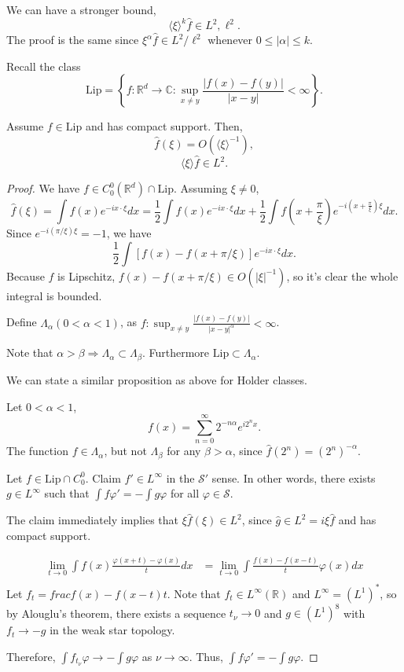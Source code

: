 \documentclass[11pt]{scrartcl}
\newcommand{\R}{\mathbb{R}}
\newcommand{\C}{\mathbb C}
\newcommand{\SRS}{\mathscr {S}}
\let \phi \varphi
\let \hat \widehat
\newcommand{\<}{\langle}
\renewcommand{\>}{\rangle}
\begin{document}
We can have a stronger bound,
$$\<\xi\>^k \hat{f} \in L^2, \ell^2.$$
The proof is the same since $\xi^\alpha \hat{f} \in L^2/ \ell^2$ whenever $0 \le |\alpha| \le k$.   

Recall the class $$\text{Lip} = \left\{f : \R^d \rightarrow \C : \sup_{x \ne y} \frac{|f(x) - f(y)|}{|x-y|} < \infty\right\}.$$
\begin{proposition} Assume $f \in \text{Lip}$ and has compact support.  Then, $$\hat{f}(\xi) = O(\<\xi\>^{-1}),$$
$$\<\xi\> \hat{f} \in L^2.$$
\end{proposition}
\begin{proof}
We have $f \in C_0^0(\R^d) \cap \text{Lip}$.  
Assuming $\xi \ne 0$, 
$$\hat{f}(\xi) = \int f(x) e^{-ix\cdot \xi}dx = \frac{1}{2} \int f(x)e^{-ix \cdot \xi}dx + \frac{1}{2} \int f(x + \frac{\pi}{\xi})e^{-i(x+\frac{\pi}{\xi})\xi}dx.$$
Since $e^{-i(\pi/\xi) \xi} = -1$, we have
$$\frac{1}{2} \int [f(x) - f(x+\pi/\xi)]e^{-ix \cdot \xi} dx.$$
Because $f$ is Lipschitz, $f(x) - f(x+\pi/\xi) \in O(|\xi|^{-1})$, so it's clear the whole integral is bounded.

\begin{definition} Define $\Lambda_{\alpha}(0 < \alpha < 1)$, as 
$f: \sup_{x \ne y} \frac{|f(x) - f(y)|}{|x-y|^{\alpha}} < \infty$. 

Note that $\alpha > \beta \Rightarrow \Lambda_\alpha \subset \Lambda_\beta$.  Furthermore $\text{Lip} \subset \Lambda_\alpha$.
\end{definition}
We can state a similar proposition as above for Holder classes.
\begin{example} Let $0 < \alpha < 1$,
$$f(x) = \sum_{n=0}^{\infty} 2^{-n \alpha} e^{i 2^n x}.$$
The function $f \in \Lambda_{\alpha}$, but not $\Lambda_\beta$ for any $\beta > \alpha$, since $\hat{f}(2^n) = (2^n)^{-\alpha}$.
\end{example}
Let $f \in \text{Lip} \cap C_0^0$.  Claim $f' \in L^{\infty}$ in the $\SRS'$ sense.  In other words, there exists $g \in L^{\infty}$ such that $\int f \phi' = - \int g \phi$ for all $\phi \in \SRS$.

The claim immediately implies that $\xi \hat{f}(\xi) \in L^2$, since $\hat{g} \in L^2 = i \xi \hat{f}$ and has compact support.  

\begin{align*}
\lim_{t \rightarrow 0} \int f(x) \frac{\phi(x+t) - \phi(x)}{t}dx&= \lim_{t \rightarrow 0} \int \frac{f(x) - f(x-t)}{t}\phi(x)dx\\
\end{align*}
Let $f_t = frac{f(x) - f(x-t) }{t}$.  Note that $f_t \in L^\infty(\R)$ and $L^{\infty} = (L^1)^{*}$, so by Alouglu's theorem, there exists a sequence $t_{\nu} \rightarrow 0$ and $g \in (L^1)^8$ with $f_t \rightarrow -g$ in the weak star topology. 

Therefore, $\int f_{t_\nu} \phi \rightarrow -\int g \phi$ as $\nu \rightarrow \infty$.  Thus, $\int f \phi' = -\int g \phi$.
\end{proof}
\end{document}
